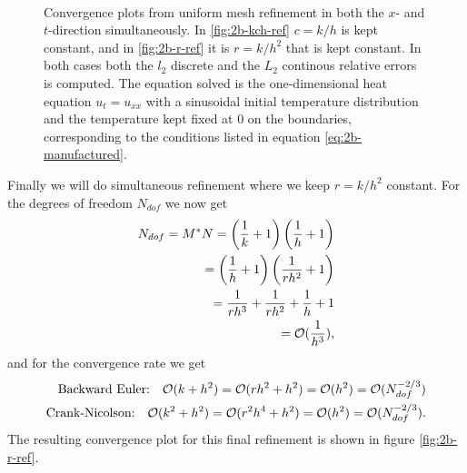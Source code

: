 \begin{figure}
    \centering
    \label{fig:2b-kch-r-ref}
    \subfloat[Convergence plots from uniform refinement with constant $c=k/h$.]{
        
        \label{fig:2b-kch-ref}
    } \\ \medskip
    \subfloat[Convergence plots from uniform refinement with constant $r=k/h^2$.]{
        
        \label{fig:2b-r-ref}
    }
    \caption{
        Convergence plots from uniform mesh refinement in both the $x$- and $t$-direction simultaneously. 
        In \ref{fig:2b-kch-ref} $c=k/h$ is kept constant, 
        and in \ref{fig:2b-r-ref} it is $r=k/h^2$ that is kept constant. 
        In both cases 
        both the $l_2$ discrete and the $L_2$ continous relative errors is computed. 
        The equation solved is the one-dimensional heat equation $u_t=u_{xx}$ 
        with a sinusoidal initial temperature distribution and the temperature kept fixed at $0$ 
        on the boundaries, 
        corresponding to the conditions listed in equation \eqref{eq:2b-manufactured}. 
    }
\end{figure}

Finally we will do simultaneous refinement where we keep $r=k/h^2$ constant. 
For the degrees of freedom $N_{dof}$ we now get 
\begin{equation*}
\begin{split}
    N_{dof} = M^* N = \left(\frac{1}{k}+1\right)\left(\frac{1}{h}+1\right)
    \\ = \left(\frac{1}{h}+1\right)\left(\frac{1}{rh^2}+1\right)
    \\ = \frac{1}{rh^3} + \frac{1}{rh^2} + \frac{1}{h} + 1 
    \\ = \mathcal{O}(\frac{1}{h^3}), 
\end{split}
\end{equation*}
and for the convergence rate we get 
\begin{equation*}
\begin{split}
    \text{Backward Euler:} \quad \mathcal{O}(k+h^2) = \mathcal{O}(rh^2+h^2) = \mathcal{O}(h^2) = \mathcal{O}(N_{dof}^{-2/3})\\
    \text{Crank-Nicolson:} \quad \mathcal{O}(k^2+h^2) = \mathcal{O}(r^2 h^4+h^2) = \mathcal{O}(h^2) = \mathcal{O}(N_{dof}^{-2/3}). 
\end{split}
\end{equation*}
The resulting convergence plot for this final refinement is shown in figure \ref{fig:2b-r-ref}. 


